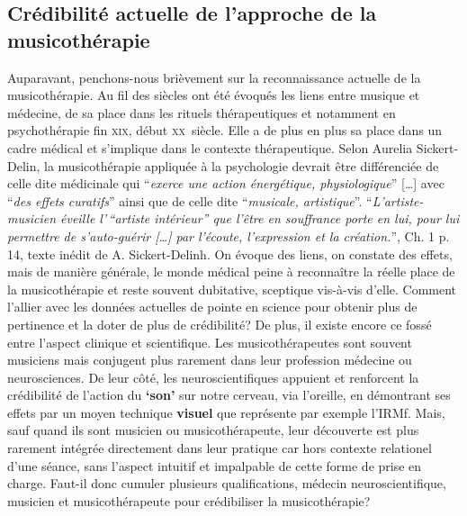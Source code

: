 \subsection{Crédibilité actuelle de l'approche de la musicothérapie }

Auparavant, penchons-nous brièvement sur la reconnaissance actuelle de la musicothérapie.
Au fil des siècles ont été évoqués les liens entre musique et médecine, de sa place dans les
rituels thérapeutiques et notamment en psychothérapie fin \textsc{xix}\ieme,
début \textsc{xx}\ieme\ siècle.
Elle a de plus en plus sa place dans un cadre médical et s'implique dans le contexte thérapeutique.
Selon Aurelia Sickert-Delin, la musicothérapie appliquée à la
psychologie devrait être différenciée de celle dite médicinale qui
\enquote{\emph{exerce une action
énergétique, physiologique}} [\dots] avec \enquote{\emph{des effets curatifs}}
ainsi que de celle dite \enquote{\emph{musicale, artistique}}.
\enquote{\emph{L'artiste-musicien éveille l'\,``artiste intérieur'' que l'être
en souffrance porte en lui, pour lui permettre de s'auto-guérir [\dots] par
l'écoute, l'expression et la création.}}\autocite {viret:b}, Ch. 1 p. 14,
texte inédit de A. Sickert-Delinh.
On évoque des liens, on constate des effets, mais de manière générale, le monde médical peine à reconnaître la réelle place de la musicothérapie et reste souvent dubitative, sceptique vis-à-vis d'elle.
 Comment l'allier avec les données actuelles de pointe en
science pour obtenir plus de pertinence
et la doter de plus de crédibilité?
De plus, il existe encore ce fossé entre l'aspect clinique et scientifique.
Les musicothérapeutes sont souvent musiciens mais conjugent plus
rarement dans leur profession
médecine ou neurosciences. De leur côté, les neuroscientifiques appuient
et renforcent la crédibilité de l'action du \textbf{`son'} sur notre cerveau, via
l'oreille, en démontrant ses effets par un moyen technique
\textbf{visuel} que représente par exemple l'IRMf. Mais, sauf quand ils sont musicien ou
musicothérapeute, leur découverte est plus rarement intégrée
directement dans leur pratique car hors contexte relationel d'une
séance, sans l'aspect intuitif et impalpable de cette forme de prise
en charge.
Faut-il donc cumuler plusieurs qualifications, médecin neuroscientifique,  musicien et musicothérapeute pour crédibiliser la musicothérapie?

